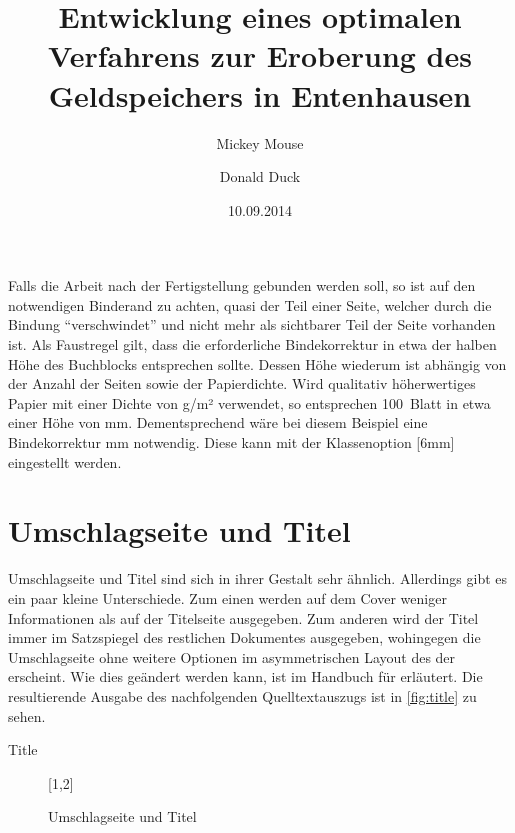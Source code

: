 \documentclass[%
  english,ngerman,%
  geometry=no,DIV=12,automark,%
]{tudscrartcl}
\begin{document}
Falls die Arbeit nach der Fertigstellung gebunden werden soll, so ist auf den 
notwendigen Binderand zu achten, quasi der Teil einer Seite, welcher durch die 
Bindung \enquote{verschwindet} und nicht mehr als sichtbarer Teil der Seite 
vorhanden ist. Als Faustregel gilt, dass die erforderliche Bindekorrektur in 
etwa der halben Höhe des Buchblocks entsprechen sollte. Dessen Höhe wiederum 
ist abhängig von der Anzahl der Seiten sowie der Papierdichte. Wird qualitativ 
höherwertiges Papier mit einer Dichte von \unit[100]{g/m²} verwendet, so 
entsprechen 100~Blatt in etwa einer Höhe von \unit[12]{mm}. Dementsprechend 
wäre bei diesem Beispiel eine Bindekorrektur \unit[6]{mm} notwendig. Diese 
kann mit der Klassenoption [6mm] eingestellt werden.



\section{Umschlagseite und Titel}
Umschlagseite und Titel sind sich in ihrer Gestalt sehr ähnlich. Allerdings 
gibt es ein paar kleine Unterschiede. Zum einen werden auf dem Cover weniger 
Informationen als auf der Titelseite ausgegeben. Zum anderen wird der Titel 
immer im Satzspiegel des restlichen Dokumentes ausgegeben, wohingegen die 
Umschlagseite ohne weitere Optionen im asymmetrischen Layout des \CDs der \TnUD 
erscheint. Wie dies geändert werden kann, ist im Handbuch für  
erläutert. Die resultierende Ausgabe des nachfolgenden Quelltextauszugs ist in 
\autoref{fig:title} zu sehen.
%
\begin{Excerpt!}{Title}
\title{%
  Entwicklung eines optimalen Verfahrens zur Eroberung des
  Geldspeichers in Entenhausen
}
\author{%
  Mickey Mouse
  \and%
  Donald Duck
}
\date{10.09.2014}
\makecover
\maketitle
\end{Excerpt!}
%
\begin{figure}
[1,2]
\caption{Umschlagseite und Titel}
\label{fig:title}
\end{figure}
\end{document}
